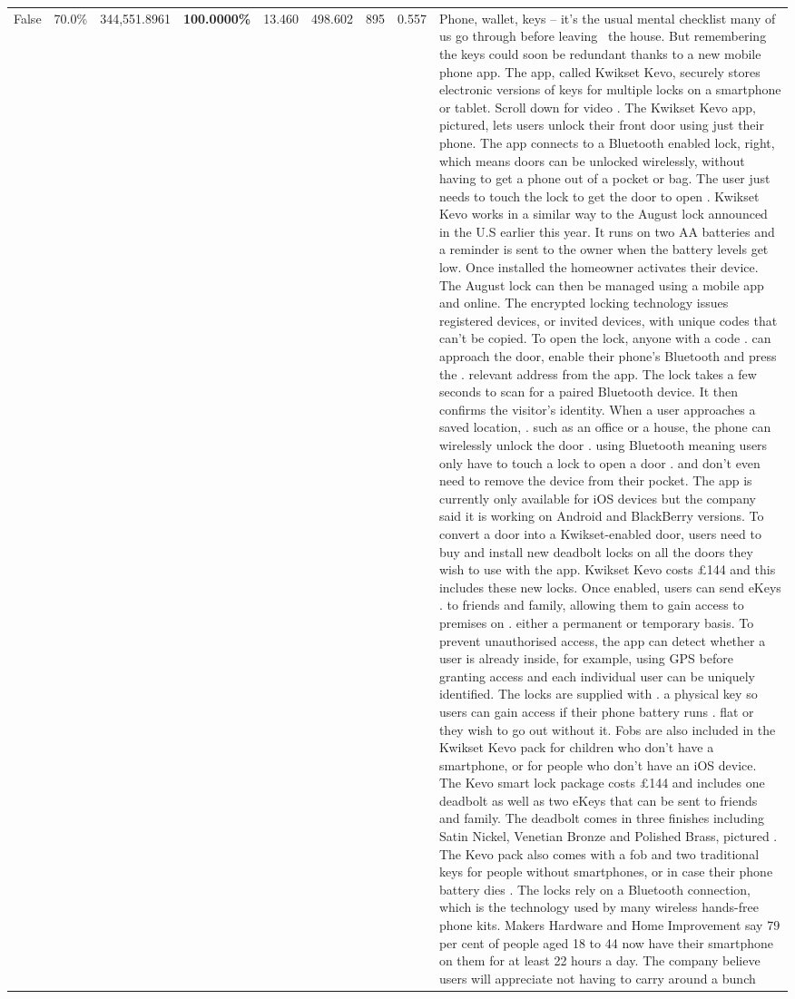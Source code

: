 \begin{table}[H]
\begin{tabular}{lllrlllll}
False & 70.0\% & 344,551.8961 & \bfseries \color{red} 100.0000\% & 13.460 & 498.602 & 895 & 0.557 & Phone, wallet, keys – it’s the usual mental checklist many of us go through before leaving  the house. But remembering the keys could soon be redundant thanks to a new mobile phone app. The app, called Kwikset Kevo, securely stores electronic versions of keys for multiple locks on a smartphone or tablet. Scroll down for video . The Kwikset Kevo app, pictured, lets users unlock their front door using just their phone. The app connects to a Bluetooth enabled lock, right, which means doors can be unlocked wirelessly, without having to get a phone out of a pocket or bag. The user just needs to touch the lock to get the door to open . Kwikset Kevo works in a similar way to the August lock announced in the U.S earlier this year. It runs on two AA batteries and a reminder is sent to the owner when the battery levels get low. Once installed the homeowner activates their device. The August lock can then be managed using a mobile app and online. The encrypted locking technology issues registered devices, or invited devices, with unique codes that can't be copied. To open the lock, anyone with a code . can approach the door, enable their phone's Bluetooth and press the . relevant address from the app. The lock takes a few seconds to scan for a paired Bluetooth device. It then confirms the visitor's identity. When a user approaches a saved location, . such as an office or a house, the phone can wirelessly unlock the door . using Bluetooth meaning users only have to touch a lock to open a door . and don't even need to remove the device from their pocket. The app is currently only available for iOS devices but the company said it is working on Android and BlackBerry versions. To convert a door into a Kwikset-enabled door, users need to buy and install new deadbolt locks on all the doors they wish to use with the app. Kwikset Kevo costs £144 and this includes these new locks. Once enabled, users can send eKeys . to friends and family, allowing them to gain access to premises on . either a permanent or temporary basis. To prevent unauthorised access, the app can detect whether a user is already inside, for example, using GPS before granting access and each individual user can be uniquely identified. The locks are supplied with . a physical key so users can gain access if their phone battery runs . flat or they wish to go out without it. Fobs are also included in the Kwikset Kevo pack for children who don't have a smartphone, or for people who don't have an iOS device. The Kevo smart lock package costs £144 and includes one deadbolt as well as two eKeys that can be sent to friends and family. The deadbolt comes in three finishes including Satin Nickel, Venetian Bronze and Polished Brass, pictured . The Kevo pack also comes with a fob and two traditional keys for people without smartphones, or in case their phone battery dies . The locks rely on a Bluetooth connection, which is the technology used by many wireless hands-free phone kits. Makers Hardware and Home Improvement say 79 per cent of people aged 18 to 44 now have their smartphone on them for at least 22 hours a day. The company believe users will appreciate not having to carry around a bunch 
\end{tabular}
\end{table}
